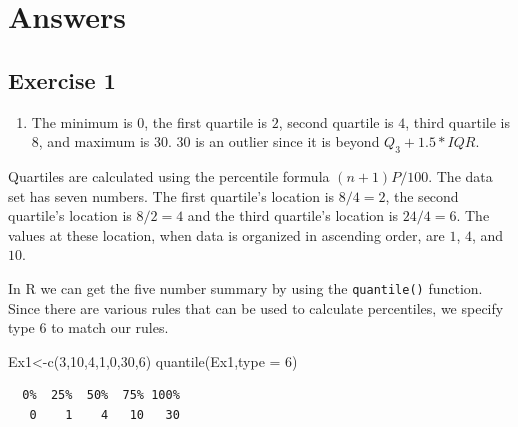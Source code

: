 \documentclass[
  letterpaper,
  DIV=11,
  numbers=noendperiod]{scrreprt}
\newenvironment{Shaded}{\begin{snugshade}}{\end{snugshade}}
\newcommand{\AttributeTok}[1]{\textcolor[rgb]{0.40,0.45,0.13}{#1}}
\newcommand{\DecValTok}[1]{\textcolor[rgb]{0.68,0.00,0.00}{#1}}
\newcommand{\FunctionTok}[1]{\textcolor[rgb]{0.28,0.35,0.67}{#1}}
\newcommand{\NormalTok}[1]{\textcolor[rgb]{0.00,0.23,0.31}{#1}}
\newcommand{\OtherTok}[1]{\textcolor[rgb]{0.00,0.23,0.31}{#1}}
\providecommand{\tightlist}{%
  \setlength{\itemsep}{0pt}\setlength{\parskip}{0pt}}\usepackage{longtable,booktabs,array}
\begin{document}
\hypertarget{answers-4}{%
\section{Answers}\label{answers-4}}

\hypertarget{exercise-1-9}{%
\subsection*{Exercise 1}\label{exercise-1-9}}

\begin{blackbox}

\begin{enumerate}
\def\labelenumi{\arabic{enumi}.}
\tightlist
\item
  The minimum is \(0\), the first quartile is \(2\), second quartile is
  \(4\), third quartile is \(8\), and maximum is \(30\). \(30\) is an
  outlier since it is beyond \(Q_{3}+1.5*IQR\).
\end{enumerate}

\end{blackbox}

Quartiles are calculated using the percentile formula \((n+1)P/100\).
The data set has seven numbers. The first quartile's location is
\(8/4=2\), the second quartile's location is \(8/2=4\) and the third
quartile's location is \(24/4=6\). The values at these location, when
data is organized in ascending order, are \(1\), \(4\), and \(10\).

In R we can get the five number summary by using the \texttt{quantile()}
function. Since there are various rules that can be used to calculate
percentiles, we specify type \(6\) to match our rules.

\begin{Shaded}
\begin{Highlighting}[numbers=left,,]
\NormalTok{Ex1}\OtherTok{\textless{}{-}}\FunctionTok{c}\NormalTok{(}\DecValTok{3}\NormalTok{,}\DecValTok{10}\NormalTok{,}\DecValTok{4}\NormalTok{,}\DecValTok{1}\NormalTok{,}\DecValTok{0}\NormalTok{,}\DecValTok{30}\NormalTok{,}\DecValTok{6}\NormalTok{)}
\FunctionTok{quantile}\NormalTok{(Ex1,}\AttributeTok{type =} \DecValTok{6}\NormalTok{)}
\end{Highlighting}
\end{Shaded}

\begin{verbatim}
  0%  25%  50%  75% 100% 
   0    1    4   10   30 
\end{verbatim}
\end{document}
